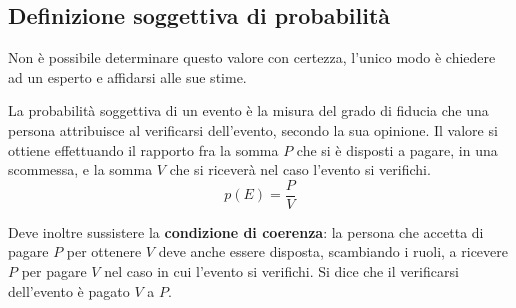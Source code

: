 \documentclass{article}     %
\begin{document}
                \subsection{Definizione soggettiva di probabilità}
                    \begin{ex}
                        Non è possibile determinare questo valore con certezza, l'unico modo è chiedere ad un esperto e affidarsi alle sue stime. 
                    \end{ex}

                    \begin{boxdef}
                        La probabilità soggettiva di un evento è la misura del grado di fiducia che una persona attribuisce al verificarsi dell'evento, secondo la sua opinione. Il valore si ottiene effettuando il rapporto fra la somma $P$ che si è disposti a pagare, in una scommessa, e la somma $V$ che si riceverà nel caso l'evento si verifichi.
                        \[p(E)=\frac{P}{V}\]
                    \end{boxdef}
                    Deve inoltre sussistere la \textbf{condizione di coerenza}: la persona che accetta di pagare $P$ per ottenere $V$ deve anche essere disposta, scambiando i ruoli, a ricevere $P$ per pagare $V$ nel caso in cui l'evento si verifichi. Si dice che il verificarsi dell'evento è pagato $V$ a $P$.
\end{document}
